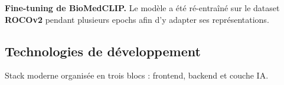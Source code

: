 \documentclass[12pt,a4paper]{article}
\begin{document}
\vspace{0.6cm}

\noindent\textbf{Fine-tuning de BioMedCLIP.}
Le modèle a été ré-entraîné sur le dataset \textbf{ROCOv2} pendant plusieurs epochs
afin d'y adapter ses représentations.

\vspace{0.5cm}

\subsection{Technologies de développement}

\vspace{0.2cm}
Stack moderne organisée en trois blocs : frontend, backend et couche IA.

\vspace{0.4cm}
\end{document}
